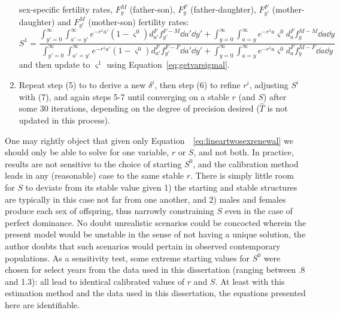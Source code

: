 \begin{enumerate}
  sex-specific fertility rates, $F_y^M$ (father-son), $F_y^F$
  (father-daughter), $F_{y'}^F$ (mother-daughter) and $F_{y'}^M$ (mother-son)
  fertility rates:
  \begin{equation}
  S^1 = \frac{ \int _{y'=0}^\infty \int _{a'=y'}^\infty e^{-r^1a'}
                      (1-\varsigma^0)d_{a'}^F f_{y'}^{F-M} \dd a' \dd y' + \int
                      _{y=0}^\infty \int _{a=y}^\infty e^{-r^1a}
                      \varsigma^0 d_{a}^F f_{y}^{M-M} \dd a \dd y}{\int
                      _{y'=0}^\infty \int _{a'=y'}^\infty e^{-r^1a'}
                      (1-\varsigma^0)d_{a'}^F f_{y'}^{F-F} \dd a' \dd y' + \int
                      _{y=0}^\infty \int _{a=y}^\infty e^{-r^1a} \varsigma^0
                      d_{a}^F f_{y}^{M-F} \dd a \dd y}
  \end{equation}
  and then update to $\varsigma^1$ using Equation~\eqref{eq:getvarsigmal}.
  \item Repeat step (5) to to derive a new $\delta^i$, then step (6) to refine
  $r^i$, adjusting $S^i$ with (7), and again steps 5-7 until converging on a
  stable $r$ (and $S$) after some 30 iterations, depending on the degree of
  precision desired ($\widehat{T}$ is not updated in this process).
\end{enumerate}
  One may rightly object that given only
  Equation~~\eqref{eq:lineartwosexrenewal} we should only be able to
  solve for one variable, $r$ or $S$, and not both. In practice, results are
  not sensitive to the choice of starting $S^0$, and the
  calibration method leads in any (reasonable) case to the same stable $r$.
  There is simply little room for $S$ to deviate from its stable value given 
  1) the starting and stable structures are typically in this
  case not far from one another, and 2) males and females produce each sex of
  offspring, thus narrowly constraining $S$ even in the case of
  perfect dominance. No doubt unrealistic scenarios could be concocted wherein
  the present model would be unstable in the sense of not having a unique 
  solution, the author doubts that
  such scenarios would pertain in observed contemporary populations. As a
  sensitivity test, some extreme starting values for $S^0$ were chosen for
  select years from the data used in this dissertation (ranging between .8 and
  1.3): all lead to identical calibrated values of $r$ and $S$. At least with
  this estimation method and the data used in this dissertation, the equations
  presented here are identifiable.
